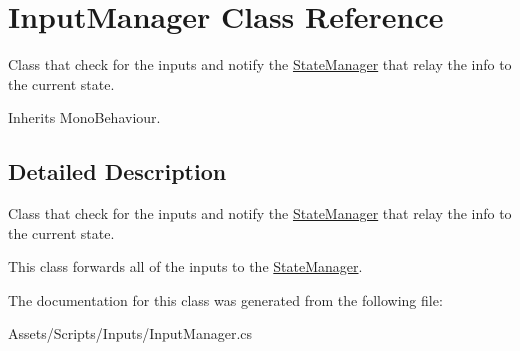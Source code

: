\hypertarget{class_input_manager}{\section{Input\-Manager Class Reference}
\label{class_input_manager}
}


Class that check for the inputs and notify the \hyperlink{class_state_manager}{State\-Manager} that relay the info to the current state. 




Inherits Mono\-Behaviour.



\subsection{Detailed Description}
Class that check for the inputs and notify the \hyperlink{class_state_manager}{State\-Manager} that relay the info to the current state.

This class forwards all of the inputs to the \hyperlink{class_state_manager}{State\-Manager}. 

The documentation for this class was generated from the following file\-:\begin{DoxyCompactItemize}
\item 
Assets/\-Scripts/\-Inputs/Input\-Manager.\-cs\end{DoxyCompactItemize}
